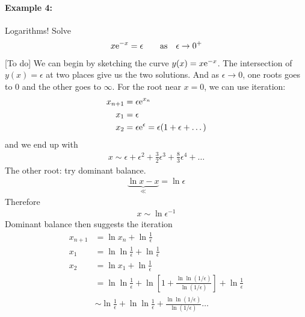 \paragraph{Example 4:} Logarithms! Solve
\begin{gather*}
	x \mathrm{e}^{-x} = \epsilon \qquad \text{as} \quad \epsilon \rightarrow 0^+
\end{gather*}
{\color{red} [To do]} We can begin by sketching the curve $y(x) = x\mathrm{e}^{-x}$. The intersection of $y(x) = \epsilon$ at two places give us the two solutions. And as $\epsilon \rightarrow 0$, one roots goes to 0 and the other goes to $\infty$. For the root near $x=0$, we can use iteration:
\begin{align*}
	x_{n+1} &= \epsilon \mathrm{e}^{x_n} \\
	x_1 &= \epsilon \\
	x_2 &= \epsilon \mathrm{e}^{\epsilon} = \epsilon(1+ \epsilon + \dots ) 
\end{align*}
and we end up with
\begin{gather*}
	x \sim \epsilon + \epsilon^2 + \frac{3}{2} \epsilon^3 + \frac{8}{3} \epsilon^4 + \dots 
\end{gather*}
The other root: try dominant balance.
\begin{gather*}
	\underbrace{\ln x - x}_\ll  = \ln \epsilon
\end{gather*}
Therefore
\begin{gather*}
	x \sim \ln \epsilon^{-1}
\end{gather*} 
Dominant balance then suggests the iteration
\begin{align*}
	x_{n+1} &= \ln x_n + \ln \frac{1}{\epsilon} \\
	x_1 &= \ln \ln \frac{1}{\epsilon} + \ln \frac{1}{\epsilon} \\
	x_2 &= \ln x_1 + \ln \frac{1}{\epsilon} \\
	&= \ln \ln \frac{1}{\epsilon} + \ln \left[1 + \frac{\ln \ln (1/\epsilon)}{\ln (1/\epsilon)}\right] + \ln \frac{1}{\epsilon} \\
	&\sim  \ln \frac{1}{\epsilon} + \ln \ln \frac{1}{\epsilon} + \frac{\ln \ln (1/\epsilon)}{\ln (1/\epsilon)} \dots 
\end{align*}

